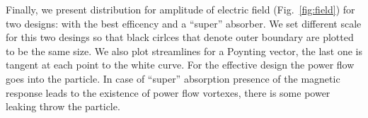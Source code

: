 \documentclass[aps,prl,twocolumn,showpacs,superscriptaddress,groupedaddress]{revtex4-1}
\begin{document}
\begin{figure}
\end{figure}
Finally, we present distribution for amplitude of electric field
(Fig.~\ref{fig:field}) for two designs: with the best efficency and a
``super'' absorber.  We set different scale for this two desings so
that black cirlces that denote outer boundary are plotted to be the
same size.  We also plot streamlines for a Poynting vector, the last
one is tangent at each point to the white curve.  For the effective
design the power flow goes into the particle.  In case of ``super''
absorption presence of the magnetic response leads to the existence of
power flow vortexes, there is some power leaking throw the particle.









\end{document}
